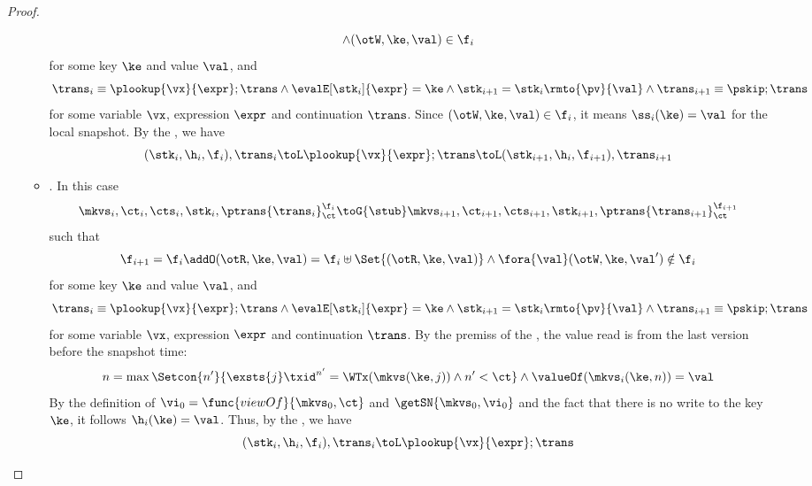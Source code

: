 \begin{proof}
\begin{itemize}
\begin{itemize}
\[                    \land (\otW,\ke, \val) \in \f_i
                \]
                for some key \( \ke \) and value \( \val \), and
                \[
                    \trans_{i} \equiv \plookup{\vx}{\expr} ; \trans 
                    \land \evalE[\stk_i]{\expr} = \ke 
                    \land \stk_{i+1} = \stk_i\rmto{\pv}{\val}
                    \land  \trans_{i+1} \equiv \pskip ; \trans
                \]
                for some variable \( \vx \), expression \( \expr \) and continuation \( \trans \).
                Since \( ( \otW, \ke ,\val ) \in \f_i  \), it means \( \ss_i(\ke) = \val \) for the local snapshot.
                By the , we have 
                \[
                    (\stk_i, \h_i, \f_i), \trans_i \toL \plookup{\vx}{\expr} ; \trans 
                    \toL (\stk_{i+1}, \h_i, \f_{i+1} ), \trans_{i+1}
                \]
            \item {}.
                In this case
                \[
                    \mkvs_i, \ct_i, \cts_i, \stk_i, \ptrans{\trans_i}_\ct^{\f_i}
                    \toG{\stub}
                    \mkvs_{i+1}, \ct_{i+1}, \cts_{i+1}, \stk_{i+1}, \ptrans{\trans_{i+1}}_\ct^{\f_{i+1}}
                \]
                such that
                \[
                    \f_{i+1} = \f_i \addO (\otR, \ke, \val) = \f_i \uplus \Set{(\otR, \ke, \val)}
                    \land \fora{\val} (\otW,\ke, \val') \notin \f_i
                \]
                for some key \( \ke \) and value \( \val \), and
                \[
                    \trans_{i} \equiv \plookup{\vx}{\expr} ; \trans 
                    \land \evalE[\stk_i]{\expr} = \ke 
                    \land \stk_{i+1} = \stk_i\rmto{\pv}{\val}
                    \land  \trans_{i+1} \equiv \pskip ; \trans
                \]
                for some variable \( \vx \), expression \( \expr \) and continuation \( \trans \).
                By the premiss of the , the value read is from the last version before the snapshot time:
                \[
                    n = \max\Setcon{n'}{%
                        \exsts{j} \txid^{n'} = \WTx(\mkvs(\ke, j)) \land n' < \ct%
                    } 
                    \land \valueOf(\mkvs_i(\ke,n) ) = \val
                \]                 
                By the definition of \( \vi_0 = \func{viewOf}{\mkvs_0,\ct} \) and \( \getSN{\mkvs_0,\vi_0} \) and the fact that there is no write to the key \( \ke \),
                it follows \( \h_i(\ke) = \val \).
                Thus, by the , we have 
                \[
                    (\stk_i, \h_i, \f_i), \trans_i \toL \plookup{\vx}{\expr} ; \trans 
\]
\end{itemize}
\end{itemize}
\end{proof}
